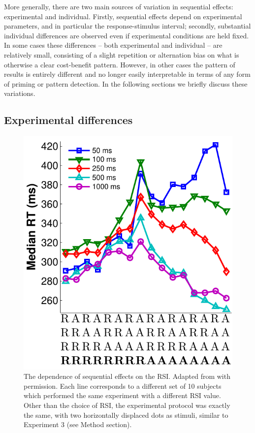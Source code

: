 \documentclass{apa}[12pt]
\begin{document}
More generally, there are two main sources of variation in sequential effects: experimental and individual. Firstly, sequential effects depend on experimental parameters, and in particular the response-stimulus interval; secondly, substantial individual differences are observed even if experimental conditions are held fixed. In some cases these differences -- both experimental and individual -- are relatively small, consisting of a slight repetition or alternation bias on what is otherwise a clear cost-benefit pattern. However, in other cases the pattern of results is entirely different and no longer easily interpretable in terms of any form of priming or pattern detection. In the following sections we briefly discuss these variations.

\subsection{Experimental differences}

\begin{figure}[t]
\centering
\includegraphics[width=.5\textwidth]{soetens_rsi_plot.pdf}
\caption[Dependence of sequential effects on the RSI]{The dependence of sequential effects on the RSI. Adapted from \protect{} with permission. Each line corresponds to a different set of 10 subjects which performed the same experiment with a different RSI value. Other than the choice of RSI, the experimental protocol was exactly the same, with two horizontally displaced dots as stimuli, similar to Experiment 3 (see Method section).}\label{soetens_rsi}
\end{figure}
\end{document}
